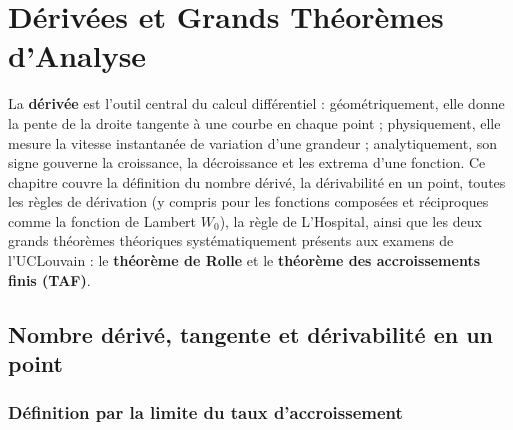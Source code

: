 \chapter{Dérivées et Grands Théorèmes d'Analyse}

La \textbf{dérivée} est l'outil central du calcul différentiel : géométriquement, elle donne la pente de la droite tangente à une courbe en chaque point ; physiquement, elle mesure la vitesse instantanée de variation d'une grandeur ; analytiquement, son signe gouverne la croissance, la décroissance et les extrema d'une fonction. Ce chapitre couvre la définition du nombre dérivé, la dérivabilité en un point, toutes les règles de dérivation (y compris pour les fonctions composées et réciproques comme la fonction de Lambert $W_0$), la règle de L'Hospital, ainsi que les deux grands théorèmes théoriques systématiquement présents aux examens de l'UCLouvain : le \textbf{théorème de Rolle} et le \textbf{théorème des accroissements finis (TAF)}.

\section{Nombre dérivé, tangente et dérivabilité en un point}

\subsection{Définition par la limite du taux d'accroissement}

